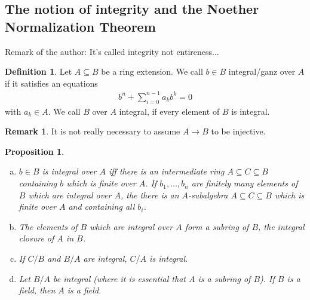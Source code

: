 \documentclass[DIV=14,parskip=half]{scrartcl}
\newtheorem{prop}{Proposition}[subsection]
\theoremstyle{definition}
\newtheorem{defi}{Definition}[subsection]
\newtheorem{rem}{Remark}[subsection]
\newcommand{\ldotspam}{,\ldots,}
\begin{document}
\subsection{The notion of integrity and the Noether Normalization Theorem}
Remark of the author: It's called integrity not entireness...
\begin{defi}\label{def:integrity}
 Let $A\subseteq B$ be a ring extension. We call $b\in B$ integral/ganz over $A$ if it satisfies an equations
 \begin{align*}
  b^n +\sum_{i=0}^{n-1} a_kb^k =0
 \end{align*}
 with $a_k\in A$. We call $B$ over $A$ integral, if every element of $B$ is integral.
\end{defi}
\begin{rem}
 It is not really necessary to assume $A\to B$ to be injective.
\end{rem}
\begin{prop}
 \begin{enumerate}[a)]
  \item $b\in B$ is integral over $A$ iff there is an intermediate ring $A\subseteq C\subseteq B$ containing $b$ which is finite over $A$. If $b_1\ldotspam b_n$ are finitely many elements of $B$ which are integral over $A$, the there is an $A$-subalgebra $A\subseteq C\subseteq B$ which is finite over $A$ and containing all $b_i$.
  \item The elements of $B$ which are integral over $A$ form a subring of $B$, the integral closure of $A$ in $B$.
  \item If $C/B$ and $B/A$ are integral, $C/A$ is integral.
  \item Let $B/A$ be integral (where it is essential that $A$ is a subring of $B$). If $B$ is a field, then $A$ is a field.
 \end{enumerate}

\end{prop}
\end{document}
